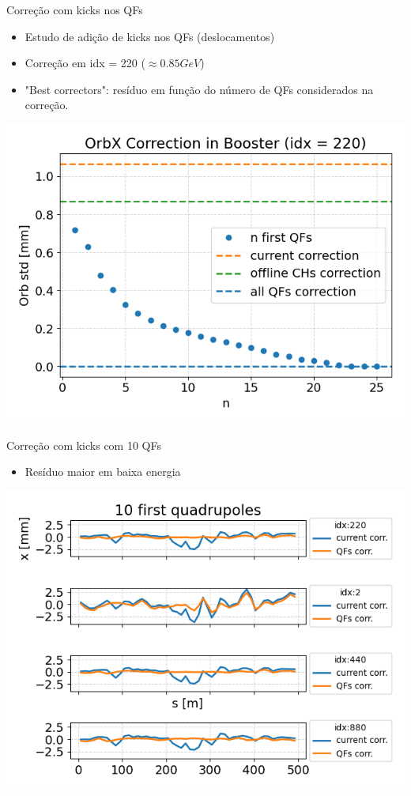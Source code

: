 \documentclass[1610]{beamer}					  %
\begin{document}
\begin{frame}{Correção com kicks nos QFs}
\vspace{0.5cm}
\begin{itemize}
    \item Estudo de adição de kicks nos QFs (deslocamentos)
    \item Correção em idx = 220 ($\approx 0.85 GeV$)
    \item "Best correctors": resíduo em função do número de QFs considerados na correção.
\vspace{0.5cm}
\end{itemize}
\centering
    \includegraphics[scale=0.5]{2024-04-19/figures/qfs-correction.png}
\end{frame}

\begin{frame}{Correção com kicks com 10 QFs}
\vspace{0.5cm}
\begin{itemize}
    \item Resíduo maior em baixa energia
\vspace{0.5cm}
\end{itemize}
\centering
    \includegraphics[scale=0.5]{2024-04-19/figures/bo-cod-corr-ramp.png}
\end{frame}
\end{document}
